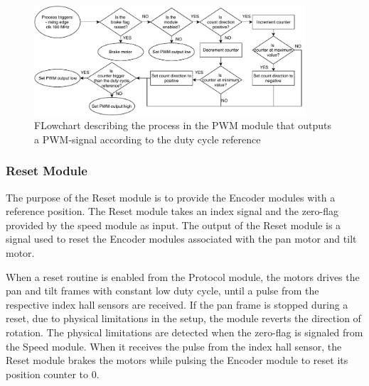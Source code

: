 \documentclass[../../main.tex]{subfiles}
\begin{document}
\begin{figure}
    \centering
    \includegraphics[width=0.9\textwidth]{Sections/System_Implementation/Images/FPGAProcessPWMOutput.pdf}
    \caption{FLowchart describing the process in the PWM module that outputs a PWM-signal according to the duty cycle reference}
    \label{fig:my_label}
\end{figure}

\subsubsection*{Reset Module}
The purpose of the Reset module is to provide the Encoder modules with a reference position.
The Reset module takes an index signal and the zero-flag provided by the speed module as input. The output of the Reset module is a signal used to reset the Encoder modules associated with the pan motor and tilt motor. 


When a reset routine is enabled from the Protocol module, the motors drives the pan and tilt frames with constant low duty cycle, until a pulse from the respective index hall sensors are received. If the pan frame is stopped during a reset, due to physical limitations in the setup, the module reverts the direction of rotation. The physical limitations are detected when the zero-flag is signaled from the Speed module. When it receives the pulse from the index hall sensor, the Reset module brakes the motors while pulsing the Encoder module to reset its position counter to 0. 



\end{document}
